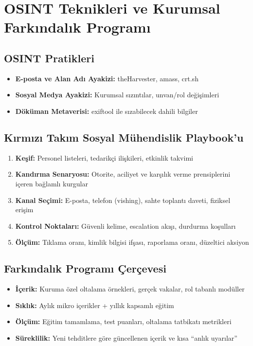 \section{OSINT Teknikleri ve Kurumsal Farkındalık Programı}

\subsection{OSINT Pratikleri}
\begin{itemize}
  \item \textbf{E-posta ve Alan Adı Ayakizi:} theHarvester, amass, crt.sh
  \item \textbf{Sosyal Medya Ayakizi:} Kurumsal sızıntılar, unvan/rol değişimleri
  \item \textbf{Döküman Metaverisi:} exiftool ile sızabilecek dahili bilgiler
\end{itemize}


\subsection{Kırmızı Takım Sosyal Mühendislik Playbook'u}
\begin{enumerate}
  \item \textbf{Keşif:} Personel listeleri, tedarikçi ilişkileri, etkinlik takvimi
  \item \textbf{Kandırma Senaryosu:} Otorite, aciliyet ve karşılık verme prensiplerini içeren bağlamlı kurgular
  \item \textbf{Kanal Seçimi:} E-posta, telefon (vishing), sahte toplantı daveti, fiziksel erişim
  \item \textbf{Kontrol Noktaları:} Güvenli kelime, escalation akışı, durdurma koşulları
  \item \textbf{Ölçüm:} Tıklama oranı, kimlik bilgisi ifşası, raporlama oranı, düzeltici aksiyon
\end{enumerate}


\subsection{Farkındalık Programı Çerçevesi}
\begin{itemize}
  \item \textbf{İçerik:} Kuruma özel oltalama örnekleri, gerçek vakalar, rol tabanlı modüller
  \item \textbf{Sıklık:} Aylık mikro içerikler + yıllık kapsamlı eğitim
  \item \textbf{Ölçüm:} Eğitim tamamlama, test puanları, oltalama tatbikatı metrikleri
  \item \textbf{Süreklilik:} Yeni tehditlere göre güncellenen içerik ve kısa “anlık uyarılar”
\end{itemize}

